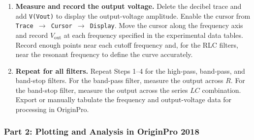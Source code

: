 \documentclass[12pt,a4paper]{article}
\begin{document}
\begin{enumerate}[leftmargin=0.8cm,label=\textbf{Step \arabic*:},itemsep=0.55em]
  \item \textbf{Measure and record the output voltage.}
  Delete the decibel trace and add \texttt{V(Vout)} to display the output-voltage amplitude. Enable the cursor from \texttt{Trace $\rightarrow$ Cursor $\rightarrow$ Display}. Move the cursor along the frequency axis and record $V_{\mathrm{out}}$ at each frequency specified in the experimental data tables. Record enough points near each cutoff frequency and, for the RLC filters, near the resonant frequency to define the curve accurately.

  \item \textbf{Repeat for all filters.}
  Repeat Steps 1--4 for the high-pass, band-pass, and band-stop filters. For the band-pass filter, measure the output across $R$. For the band-stop filter, measure the output across the series $LC$ combination. Export or manually tabulate the frequency and output-voltage data for processing in OriginPro.
\end{enumerate}

\subsubsection*{Part 2: Plotting and Analysis in OriginPro 2018}
\end{document}
